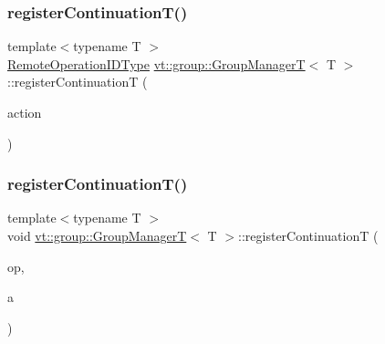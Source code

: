 \subsubsection{\texorpdfstring{register\+Continuation\+T()}{registerContinuationT()}\hspace{0.1cm}{\footnotesize\ttfamily [1/2]}}
{\footnotesize\ttfamily template$<$typename T $>$ \\
\hyperlink{namespacevt_1_1group_a73f2624ddeb535b39a08b6524f26b244}{Remote\+Operation\+I\+D\+Type} \hyperlink{structvt_1_1group_1_1_group_manager_t}{vt\+::group\+::\+Group\+ManagerT}$<$ T $>$\+::register\+ContinuationT (\begin{DoxyParamCaption}\item[{\hyperlink{structvt_1_1group_1_1_group_manager_t_acb20922687d3165d97de391fdbaf02ca}{Action\+T\+Type}}]{action }\end{DoxyParamCaption})\hspace{0.3cm}{\ttfamily [static]}}

\mbox{\label{structvt_1_1group_1_1_group_manager_t_a7cc0fcbe3319335031839ed50590be16}} 
\subsubsection{\texorpdfstring{register\+Continuation\+T()}{registerContinuationT()}\hspace{0.1cm}{\footnotesize\ttfamily [2/2]}}
{\footnotesize\ttfamily template$<$typename T $>$ \\
void \hyperlink{structvt_1_1group_1_1_group_manager_t}{vt\+::group\+::\+Group\+ManagerT}$<$ T $>$\+::register\+ContinuationT (\begin{DoxyParamCaption}\item[{\hyperlink{namespacevt_1_1group_a73f2624ddeb535b39a08b6524f26b244}{Remote\+Operation\+I\+D\+Type} const}]{op,  }\item[{\hyperlink{structvt_1_1group_1_1_group_manager_t_acb20922687d3165d97de391fdbaf02ca}{Action\+T\+Type}}]{a }\end{DoxyParamCaption})\hspace{0.3cm}{\ttfamily [static]}}

\mbox{\label{structvt_1_1group_1_1_group_manager_t_aae5c5918bcdd2add07289c8f5eec1cc8}} 
